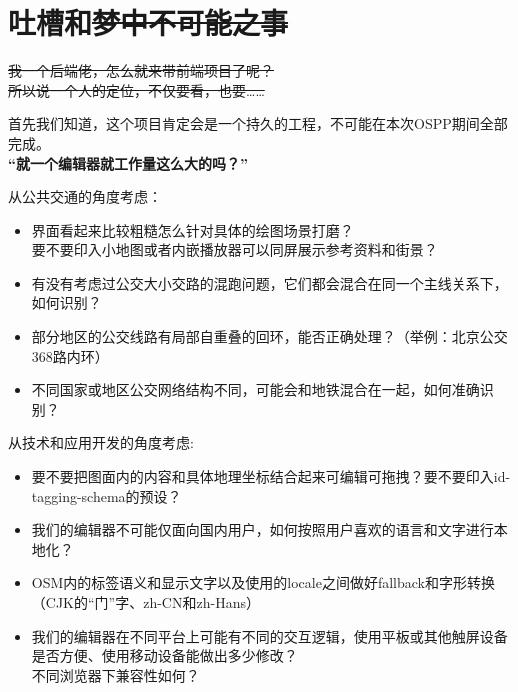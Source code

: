 \documentclass{beamer}
\begin{document}
\section{吐槽和\sout{梦中不可能之事}}

\begin{frame}
	\Large
	\sout{我一个后端佬，怎么就来带前端项目了呢？}\\
	\sout{所以说一个人的定位，不仅要看，也要……}
\end{frame}

\begin{frame}
	\large
	\quad \quad 首先我们知道，这个项目肯定会是一个持久的工程，不可能在本次OSPP期间全部完成。\\
	\vspace{4em}
	\quad \quad \textbf{“就一个编辑器就工作量这么大的吗？”}
\end{frame}


\begin{frame}
	\Large
	从公共交通的角度考虑：\\
	\normalsize
	\begin{itemize}
		\item 界面看起来比较粗糙怎么针对具体的绘图场景打磨？\\
		      要不要印入小地图或者内嵌播放器可以同屏展示参考资料和街景？
		\item  有没有考虑过公交大小交路的混跑问题，它们都会混合在同一个主线关系下，如何识别？
		\item 部分地区的公交线路有局部自重叠的回环，能否正确处理？（举例：北京公交368路内环）
		\item 不同国家或地区公交网络结构不同，可能会和地铁混合在一起，如何准确识别？
	\end{itemize}
	    
\end{frame}

\begin{frame}
	\Large
	从技术和应用开发的角度考虑: \\
	\normalsize
	\begin{itemize}
		\item 要不要把图面内的内容和具体地理坐标结合起来可编辑可拖拽？要不要印入id-tagging-schema的预设？
		\item 我们的编辑器不可能仅面向国内用户，如何按照用户喜欢的语言和文字进行本地化？
		\item OSM内的标签语义和显示文字以及使用的locale之间做好fallback和字形转换（CJK的“门”字、zh-CN和zh-Hans）
		\item 我们的编辑器在不同平台上可能有不同的交互逻辑，使用平板或其他触屏设备是否方便、使用移动设备能做出多少修改？\\
		      不同浏览器下兼容性如何？
	\end{itemize}
\end{frame}
\end{document}
